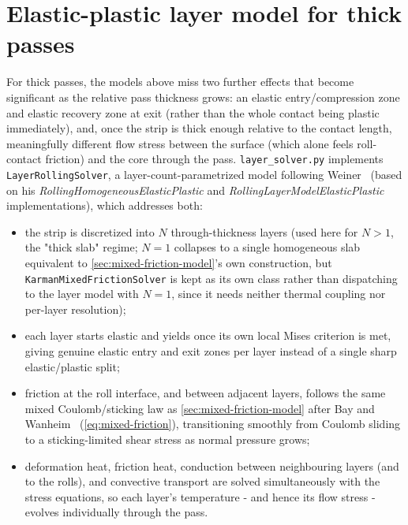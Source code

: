 \documentclass[11pt]{PyRollDocs}
\begin{document}
    \section{Elastic-plastic layer model for thick passes}\label{sec:layer-model}

    For thick passes, the models above miss two further effects that become significant as the relative pass thickness grows: an elastic entry/compression zone and elastic recovery zone at exit (rather than the whole contact being plastic immediately), and, once the strip is thick enough relative to the contact length, meaningfully different flow stress between the surface (which alone feels roll-contact friction) and the core through the pass. \lstinline{layer_solver.py} implements \lstinline{LayerRollingSolver}, a layer-count-parametrized model following Weiner~\cite{Weiner2021} (based on his \emph{RollingHomogeneousElasticPlastic} and \emph{RollingLayerModelElasticPlastic} implementations), which addresses both:

    \begin{itemize}
        \item the strip is discretized into $N$ through-thickness layers (used here for $N>1$, the "thick slab" regime; $N=1$ collapses to a single homogeneous slab equivalent to \autoref{sec:mixed-friction-model}'s own construction, but \lstinline{KarmanMixedFrictionSolver} is kept as its own class rather than dispatching to the layer model with $N=1$, since it needs neither thermal coupling nor per-layer resolution);
        \item each layer starts elastic and yields once its own local Mises criterion is met, giving genuine elastic entry and exit zones per layer instead of a single sharp elastic/plastic split;
        \item friction at the roll interface, and between adjacent layers, follows the same mixed Coulomb/sticking law as \autoref{sec:mixed-friction-model} after Bay and Wanheim~\cite{BayWanheim1976} (\autoref{eq:mixed-friction}), transitioning smoothly from Coulomb sliding to a sticking-limited shear stress as normal pressure grows;
        \item deformation heat, friction heat, conduction between neighbouring layers (and to the rolls), and convective transport are solved simultaneously with the stress equations, so each layer's temperature - and hence its flow stress - evolves individually through the pass.
    \end{itemize}
\end{document}
